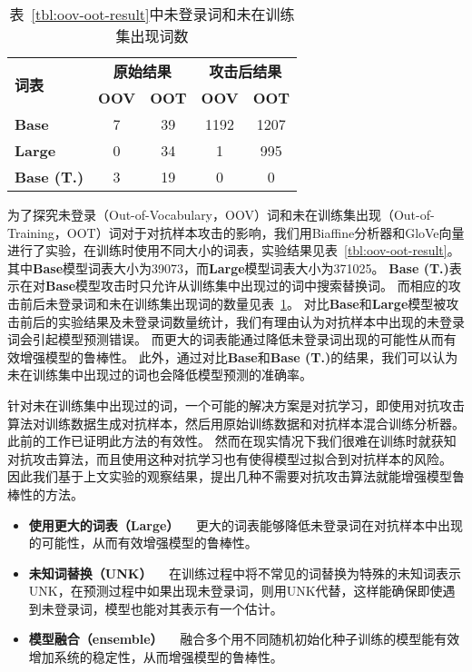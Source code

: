 \begin{table}[h]
	\centering
	\small
	\renewcommand{\arraystretch}{1.2}
	\begin{tabular}{l||cc|cc}
		\hline
		\multirow{2}{*}{\bf 词表}& \multicolumn{2}{c|}{\bf 原始结果} & \multicolumn{2}{c}{\bf 攻击后结果}  \\
		\cline{2-5}
		& \bf OOV & \bf OOT & \bf OOV & \bf OOT \\
		\hline
		\bf Base &7 &39 &1192 &1207 \\
		\bf Large  &0 &34 &1 &995  \\
		\bf Base (T.) &3 &19 &0 &0 \\
		\hline
	\end{tabular}
	\caption{表~\ref{tbl:oov-oot-result}中未登录词和未在训练集出现词数}
	\label{tbl:oov-oot-num}
\end{table}

为了探究未登录（Out-of-Vocabulary，OOV）词和未在训练集出现（Out-of-Training，OOT）词对于对抗样本攻击的影响，我们用Biaffine分析器和GloVe向量进行了实验，在训练时使用不同大小的词表，实验结果见表~\ref{tbl:oov-oot-result}。
其中\textbf{Base}模型词表大小为39073，而\textbf{Large}模型词表大小为371025。
\textbf{Base (T.)}表示在对\textbf{Base}模型攻击时只允许从训练集中出现过的词中搜索替换词。
而相应的攻击前后未登录词和未在训练集出现词的数量见表~\ref{tbl:oov-oot-num}。
对比\textbf{Base}和\textbf{Large}模型被攻击前后的实验结果及未登录词数量统计，我们有理由认为对抗样本中出现的未登录词会引起模型预测错误。
而更大的词表能通过降低未登录词出现的可能性从而有效增强模型的鲁棒性。
此外，通过对比\textbf{Base}和\textbf{Base (T.)}的结果，我们可以认为未在训练集中出现过的词也会降低模型预测的准确率。

针对未在训练集中出现过的词，一个可能的解决方案是对抗学习，即使用对抗攻击算法对训练数据生成对抗样本，然后用原始训练数据和对抗样本混合训练分析器。
此前的工作\cite{zheng2020evaluating}已证明此方法的有效性。
然而在现实情况下我们很难在训练时就获知对抗攻击算法，而且使用这种对抗学习也有使得模型过拟合到对抗样本的风险。
因此我们基于上文实验的观察结果，提出几种不需要对抗攻击算法就能增强模型鲁棒性的方法。

\begin{itemize}
	\item \textbf{使用更大的词表（Large）} \ \ 更大的词表能够降低未登录词在对抗样本中出现的可能性，从而有效增强模型的鲁棒性。
	\item \textbf{未知词替换（UNK）} \ \ 在训练过程中将不常见的词替换为特殊的未知词表示UNK，在预测过程中如果出现未登录词，则用UNK代替，这样能确保即使遇到未登录词，模型也能对其表示有一个估计。
	\item \textbf{模型融合（ensemble）} \ \ 融合多个用不同随机初始化种子训练的模型能有效增加系统的稳定性，从而增强模型的鲁棒性。
\end{itemize}

